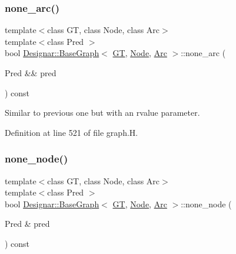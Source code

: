 \subsubsection{\texorpdfstring{none\+\_\+arc()}{none\_arc()}\hspace{0.1cm}{\footnotesize\ttfamily [2/2]}}
{\footnotesize\ttfamily template$<$class GT, class Node, class Arc$>$ \\
template$<$class Pred $>$ \\
bool \hyperlink{class_designar_1_1_base_graph}{Designar\+::\+Base\+Graph}$<$ \hyperlink{demo-buildgraph_8_c_a3001c40d2c31ca87ed96cd7d1334a55e}{GT}, \hyperlink{namespace_designar_a5af326c65aa2bd26b26c410f2030d09e}{Node}, \hyperlink{namespace_designar_a3f55fb5513d62ff47cbc8f72b8e95d6f}{Arc} $>$\+::none\+\_\+arc (\begin{DoxyParamCaption}\item[{Pred \&\&}]{pred }\end{DoxyParamCaption}) const\hspace{0.3cm}{\ttfamily [inline]}}



Similar to previous one but with an rvalue parameter. 



Definition at line 521 of file graph.\+H.

\mbox{\label{class_designar_1_1_base_graph_aa87c903e7fbf82a30edc9e442a115050}} 
\subsubsection{\texorpdfstring{none\+\_\+node()}{none\_node()}\hspace{0.1cm}{\footnotesize\ttfamily [1/2]}}
{\footnotesize\ttfamily template$<$class GT, class Node, class Arc$>$ \\
template$<$class Pred $>$ \\
bool \hyperlink{class_designar_1_1_base_graph}{Designar\+::\+Base\+Graph}$<$ \hyperlink{demo-buildgraph_8_c_a3001c40d2c31ca87ed96cd7d1334a55e}{GT}, \hyperlink{namespace_designar_a5af326c65aa2bd26b26c410f2030d09e}{Node}, \hyperlink{namespace_designar_a3f55fb5513d62ff47cbc8f72b8e95d6f}{Arc} $>$\+::none\+\_\+node (\begin{DoxyParamCaption}\item[{Pred \&}]{pred }\end{DoxyParamCaption}) const\hspace{0.3cm}{\ttfamily [inline]}}



